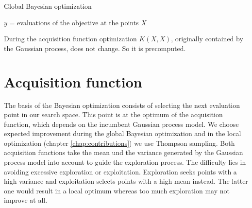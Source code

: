 \begin{algorithm}
    \caption{Global Bayesian optimization\label{alg:boGlob}}
    \BlankLine

    $y$ = evaluations of the objective at the points $X$\\
\end{algorithm}

During the acquisition function optimization $K(X,X)$, originally contained by the Gaussian process, does not change. So it is precomputed.

\section{Acquisition function}
The basis of the Bayesian optimization consists of selecting the next evaluation point in our search space. This point is at the optimum of the acquisition function, which depends on the incumbent Gaussian process model. We choose expected improvement during the global Bayesian optimization and in the local optimization (chapter \ref{chap:contributions}) we use Thompson sampling. Both acquisition functions take the mean und the variance generated by the Gaussian process model into account to guide the exploration process. The difficulty lies in avoiding excessive exploration or exploitation. Exploration seeks points with a high variance and exploitation selects points with a high mean instead. The latter one would result in a local optimum whereas too much exploration may not improve at all.

